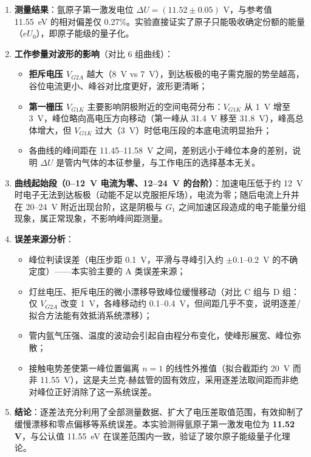 \documentclass[12pt, a4paper]{ctexart}
\begin{document}
\begin{enumerate}
    \item \textbf{测量结果}：氩原子第一激发电位 $\Delta U = (11.52 \pm 0.05)$ V，与参考值 \SI{11.55}{eV} 的相对偏差仅 0.27\%。实验直接证实了原子只能吸收确定份额的能量（$eU_0$），即原子能级的量子化。

    \item \textbf{工作参量对波形的影响}（对比 6 组曲线）：
    \begin{itemize}
        \item \textbf{拒斥电压 $V_{G2A}$} 越大（\SI{8}{V} vs \SI{7}{V}），到达板极的电子需克服的势垒越高，谷位电流更小、峰谷对比度更好，波形更清晰；
        \item \textbf{第一栅压 $V_{G1K}$} 主要影响阴极附近的空间电荷分布：$V_{G1K}$ 从 \SI{1}{V} 增至 \SI{3}{V}，峰位略向高电压方向移动（第一峰从 \SI{31.4}{V} 移至 \SI{31.8}{V}），峰高总体增大，但 $V_{G1K}$ 过大（\SI{3}{V}）时低电压段的本底电流明显抬升；
        \item 各曲线的峰间距在 11.45--\SI{11.58}{V} 之间，差别远小于峰位本身的差别，说明 $\Delta U$ 是管内气体的本征参量，与工作电压的选择基本无关。
    \end{itemize}

    \item \textbf{曲线起始段（0--\SI{12}{V} 电流为零、12--\SI{24}{V} 的台阶）}：加速电压低于约 \SI{12}{V} 时电子无法到达板极（动能不足以克服拒斥场），电流为零；随后电流上升并在 20--\SI{24}{V} 附近出现台阶，这是阴极与 $G_1$ 之间加速区段造成的电子能量分组现象，属正常现象，不影响峰间距测量。

    \item \textbf{误差来源分析}：
    \begin{itemize}
        \item 峰位判读误差（电压步距 \SI{0.1}{V}，平滑与寻峰引入约 $\pm 0.1$--\SI{0.2}{V} 的不确定度）——本实验主要的 A 类误差来源；
        \item 灯丝电压、拒斥电压的微小漂移导致峰位缓慢移动（对比 C 组与 D 组：仅 $V_{G2A}$ 改变 \SI{1}{V}，各峰移动约 0.1--\SI{0.4}{V}，但间距几乎不变，说明逐差/拟合方法能有效抵消系统漂移）；
        \item 管内氩气压强、温度的波动会引起自由程分布变化，使峰形展宽、峰位弥散；
        \item 接触电势差使第一峰位置偏离 $n=1$ 的线性外推值（拟合截距约 \SI{20}{V} 而非 \SI{11.55}{V}），这是夫兰克-赫兹管的固有效应，采用逐差法取间距而非绝对峰位正好消除了这一系统误差。
    \end{itemize}

    \item \textbf{结论}：逐差法充分利用了全部测量数据、扩大了电压差取值范围，有效抑制了缓慢漂移和零点偏移等系统误差。本实验测得氩原子第一激发电位为 \textbf{11.52 V}，与公认值 \SI{11.55}{eV} 在误差范围内一致，验证了玻尔原子能级量子化理论。
\end{enumerate}
\end{document}
